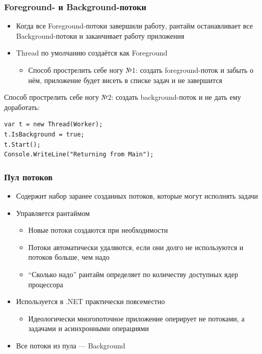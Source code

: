 \documentclass[xetex,mathserif,serif]{beamer}
\begin{document}
    \begin{frame}[fragile]
        \frametitle{Foreground- и Background-потоки}
        \begin{itemize}
            \item Когда все Foreground-потоки завершили работу, рантайм останавливает все Background-потоки и заканчивает работу приложения
            \item Thread по умолчанию создаётся как Foreground
            \begin{itemize}
                \item Способ прострелить себе ногу №1: создать foreground-поток и забыть о нём, приложение будет висеть в списке задач и не завершится
            \end{itemize}
        \end{itemize}
        \vspace{5mm}
        Способ прострелить себе ногу №2: создать background-поток и не дать ему доработать:
        \begin{verbatim}
var t = new Thread(Worker);
t.IsBackground = true;
t.Start();
Console.WriteLine("Returning from Main");
        \end{verbatim}
    \end{frame}

    \begin{frame}
        \frametitle{Пул потоков}
        \begin{itemize}
            \item Содержит набор заранее созданных потоков, которые могут исполнять задачи
            \item Управляется рантаймом
            \begin{itemize}
                \item Новые потоки создаются при необходимости
                \item Потоки автоматически удаляются, если они долго не используются и потоков больше, чем надо
                \item ``Сколько надо'' рантайм определяет по количеству доступных ядер процессора
            \end{itemize}
            \item Используется в .NET практически повсеместно
            \begin{itemize}
                \item Идеологически многопоточное приложение оперирует не потоками, а задачами и асинхронными операциями
            \end{itemize}
            \item Все потоки из пула --- Background
        \end{itemize}
    \end{frame}
\end{document}
